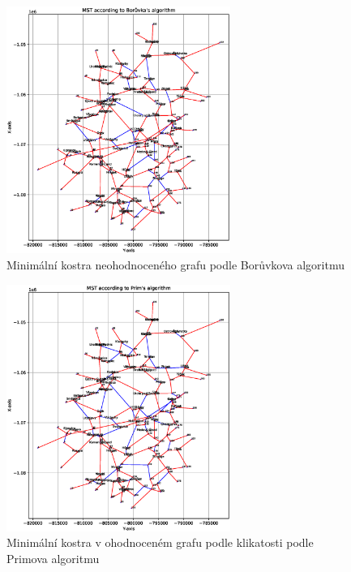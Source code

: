 \begin{figure}[H]
    \centering
    \includegraphics[width=0.65\textwidth]{images/Figure_3.eps}
    \caption{Minimální kostra neohodnoceného grafu podle Borůvkova algoritmu}
\end{figure}
\begin{figure}[H]
    \centering
    \includegraphics[width=0.65\textwidth]{images/Figure_2_curvature.eps}
    \caption{Minimální kostra v ohodnoceném grafu podle klikatosti podle Primova algoritmu}
\end{figure}
